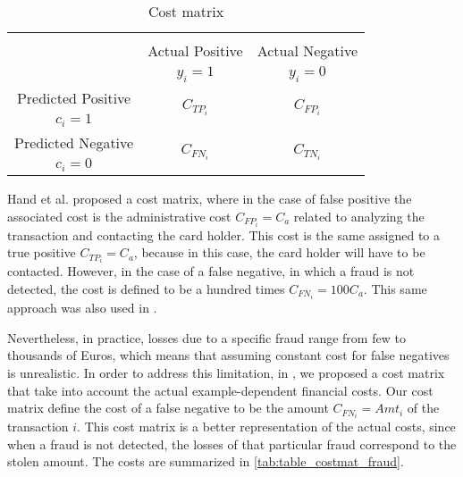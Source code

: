 	\begin{table}[b]
		\caption{Cost matrix \citep{Elkan2001}}
		\centering
		\begin{tabular}{c|c|c}
		\multicolumn{3}{c}{}\\
			\multicolumn{1}{c|}{}  & Actual Positive& Actual Negative \\
			\multicolumn{1}{c|}{} & $y_i=1$& $y_i=0$ \\
			\hline
			Predicted Positive 		& \multirow{ 2}{*}{$C_{TP_i}$} & \multirow{ 2}{*}{$C_{FP_i}$} 
			\\
			$c_i=1$ & &\\
			\hline
			Predicted Negative  	& \multirow{ 2}{*}{$C_{FN_i}$} & \multirow{ 
			2}{*}{$C_{TN_i}$} \\
			$c_i=0$ & &\\
		\end{tabular}
		\label{tab:table_costmat}
	\end{table}  

	Hand et al. \citep{Hand2007a} proposed a cost matrix, where in the case of false positive the 
	associated 	cost is the administrative cost $C_{FP_i}=C_a$ related to analyzing the transaction 
	and contacting 	the card holder. This cost is the same assigned to a true positive 
	$C_{TP_i}=C_a$, because in 	this case, 	the card holder will have to be contacted. However, in 
	the case of a false negative, in which a 	fraud is 	not detected, the cost is defined to be a 
	hundred times $C_{FN_i}=100C_a$. This same approach was also used in \citep{Gadi2008}.

	Nevertheless, in 	practice, losses due to a specific fraud 	range from few to 
	thousands of Euros, which means that 	assuming constant cost for false 	negatives is 	
	unrealistic. In order to address this limitation, in 	\citep{CorreaBahnsen2013}, we 	proposed a 
	cost matrix that take into account the actual 	example-dependent financial costs. Our 	cost 
	matrix define the cost of a false negative to be the 	amount $C_{FN_i}=Amt_i$ of the 	transaction 
	$i$. This cost matrix is a better representation of the 	actual costs, since when a 	fraud is 
	not detected, the losses of that particular fraud correspond 	to the stolen amount.
	The costs are summarized in \tablename{ \ref{tab:table_costmat_fraud}}.

